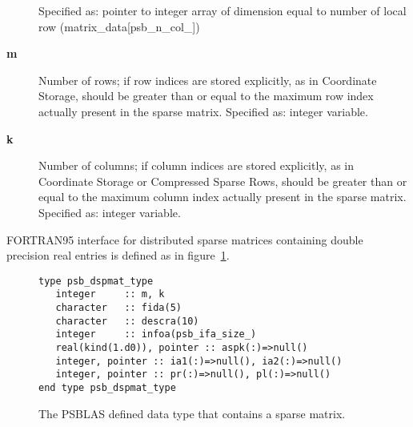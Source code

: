 \begin{description}
Specified as: pointer to integer array of dimension equal to number of
local row (matrix\_data[psb\_n\_col\_\hbox{]})
\item[{\bf m}] Number of rows; if row indices are stored explicitly,
as in Coordinate Storage, should be greater than or equal to the
maximum row index actually present in the sparse matrix.
Specified as: integer variable.
\item[{\bf k}] Number of columns; if column indices are stored explicitly,
as in Coordinate Storage or Compressed Sparse Rows, should be greater
than or equal to the maximum column  index actually present in the sparse matrix.
Specified as: integer variable.
\end{description}
FORTRAN95 interface for distributed sparse matrices containing double precision
real entries is defined as in figure~\ref{fig:spmattype}.
\begin{figure}[h!]
  \begin{Sbox}
    \begin{minipage}[tl]{0.85\textwidth}
\begin{verbatim}
type psb_dspmat_type
   integer     :: m, k
   character   :: fida(5)
   character   :: descra(10)
   integer     :: infoa(psb_ifa_size_)
   real(kind(1.d0)), pointer :: aspk(:)=>null()
   integer, pointer :: ia1(:)=>null(), ia2(:)=>null()
   integer, pointer :: pr(:)=>null(), pl(:)=>null()
end type psb_dspmat_type
\end{verbatim}
    \end{minipage}
  \end{Sbox}
  \setlength{\fboxsep}{8pt}
  \begin{center}
    \fbox{\TheSbox}
  \end{center}
  \caption{\label{fig:spmattype} 
    The PSBLAS defined data type that
    contains a sparse matrix.} 
\end{figure}

